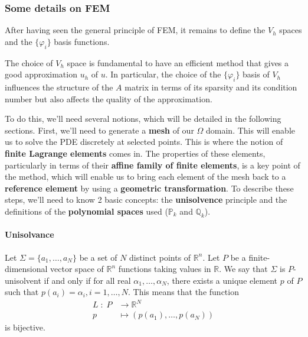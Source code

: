 \subsubsection{Some details on FEM}

After having seen the general principle of FEM, it remains to define the $V_h$ spaces and the $\{\varphi_i\}$ basis functions.

\begin{Rem}
	The choice of $V_h$ space is fundamental to have an efficient method that gives a good approximation $u_h$ of $u$. In particular, the choice of the $\{\varphi_i\}$ basis of $V_h$ influences the structure of the $A$ matrix in terms of its sparsity and its condition number but also affects the quality of the approximation.
\end{Rem}

To do this, we'll need several notions, which will be detailed in the following sections. First, we'll need to generate a \textbf{mesh} of our $\Omega$ domain. This will enable us to solve the PDE discretely at selected points. This is where the notion of \textbf{finite Lagrange elements} comes in. The properties of these elements, particularly in terms of their \textbf{affine family of finite elements}, is a key point of the method, which will enable us to bring each element of the mesh back to a \textbf{reference element} by using a \textbf{geometric transformation}. To describe these steps, we'll need to know 2 basic concepts: the \textbf{unisolvence} principle and the definitions of the \textbf{polynomial spaces} used ($\mathbb{P}_k$ and $\mathbb{Q}_k$).

\paragraph{Unisolvance}

\begin{Def}
	Let $\Sigma=\{a_1,\dots,a_N\}$ be a set of $N$ distinct points of $\mathbb{R}^n$. Let $P$ be a finite-dimensional vector space of $\mathbb{R}^n$ functions taking values in $\mathbb{R}$. We say that $\Sigma$ is $P$-unisolvent if and only if for all real $\alpha_1,\dots,\alpha_N$, there exists a unique element $p$ of $P$ such that $p(a_i)=\alpha_i,i=1,\dots,N$. 
	This means that the function
	\begin{align*}
		L \; : \; P &\rightarrow \mathbb{R}^N \\
		p &\mapsto(p(a_1),\dots,p(a_N))
	\end{align*}
	is bijective.
\end{Def}

